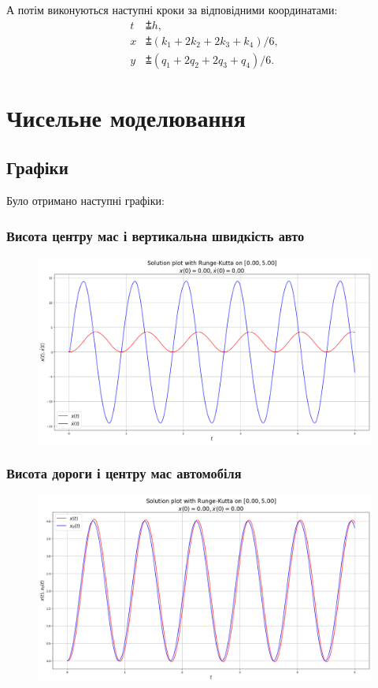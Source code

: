 А потім виконуються наступні кроки за відповідними координатами:
\begin{equation}
	\begin{aligned}
        t &\pluseqq h, \\
       	x &\pluseqq (k_1 + 2 k_2 + 2 k_3 + k_4) / 6, \\
        y &\pluseqq (q_1 + 2 q_2 + 2 q_3 + q_4) / 6.
	\end{aligned}
\end{equation}

\section{Чисельне моделювання}

\subsection{Графіки}

Було отримано наступні графіки:

\subsubsection{Висота центру мас і вертикальна швидкість авто}
\begin{figure}[H]
	\centering
	\includegraphics[width=\textwidth]{1.png}
\end{figure}

\subsubsection{Висота дороги і центру мас автомобіля}
\begin{figure}[H]
	\centering
	\includegraphics[width=\textwidth]{2.png}
\end{figure}

